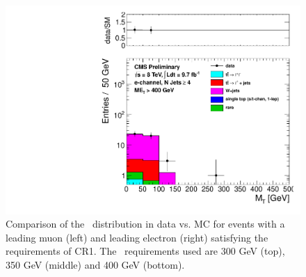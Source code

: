 \begin{figure}[hbt]
\begin{center}
        \includegraphics[width=0.5\linewidth]{plots/CR1plots/mt_met400_leadele_nj4.pdf}
    \caption{
      Comparison of the \mt\ distribution in data vs. MC for events
      with a leading muon (left) and leading electron (right)
      satisfying the requirements of CR1. The \met\ requirements used are
      300 GeV (top), 350 GeV (middle) and 400 GeV (bottom).
\label{fig:cr1mtrest2} 
}  
      \end{center}
\end{figure}


\clearpage
